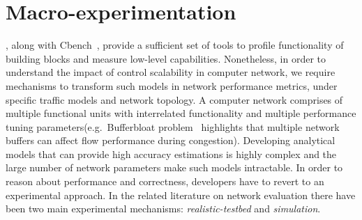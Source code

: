 

\section{\of Macro-experimentation} \label{sec:sdnsim-intro}


\oflops, along with Cbench~\cite{cbench}, provide a sufficient set of tools to
profile functionality of \of building blocks and measure low-level
capabilities. Nonetheless, in order to understand the impact of control
scalability in computer network, we require mechanisms to transform such
models in network performance metrics, under specific traffic models
and network topology. A computer network comprises of multiple functional 
units with interrelated functionality and multiple performance tuning
parameters(e.g.~Bufferbloat problem~\cite{Gettys2011} highlights that 
multiple network buffers can affect flow performance during congestion). 
Developing analytical models that can provide high accuracy estimations 
is highly complex and the large number of network parameters 
make such models intractable. 
In order to reason about performance and correctness,
developers have to revert to an experimental approach.  In the related
literature on network evaluation there have been two main experimental
mechanisms: {\it realistic-testbed} and {\it simulation}.

